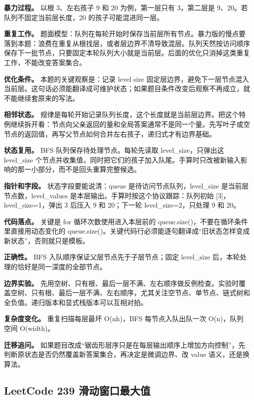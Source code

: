\textbf{暴力过程。} 以根 3、左右孩子 9 和 20 为例，第一层只有 3，第二层是 9、20。若队列不固定当前层长度，20 的孩子可能混进同一层。

\textbf{重复工作。} 题面模型：队列在每轮开始时保存当前层所有节点。暴力版的慢点要落到本题：浪费在重复从根找层，或者层边界不清导致混层。队列天然按访问顺序保存下一批节点，只要固定本轮队列大小就是当前层。后面的优化只消掉这类重复工作，不能改变答案集合。

\textbf{优化条件。} 本题的关键观察是：记录 level size 固定层边界，避免下一层节点混入当前层。这句话必须能翻译成可维护状态；如果题目条件改变后观察不再成立，就不能继续套原来的写法。

\textbf{相邻状态。} 规律是每轮开始记录队列长度，这个长度就是当前层边界。把这个特例继续拆开看：节点向父亲返回的量和全局答案通常不是同一个量。先写叶子或空节点的返回值，再写父节点如何合并左右孩子，递归式才有边界基础。

\textbf{状态复用。} BFS 队列保存待处理节点。每轮先读取 level\_size，只弹出这 level\_size 个节点并收集值，同时把它们的孩子加入队尾。手算时只改被新输入影响的那一小部分，而不是回头重算完整候选。

\textbf{指针和字段。} 状态字段要能说清：queue 是待访问节点队列，level\_size 是当前层节点数，level\_values 是本层输出。手算时按这个协议跟踪：队列初始 [3]，level\_size=1，弹出 3 后压入 9 和 20；下一轮 level\_size=2，只处理 9 和 20。

\textbf{代码落点。} 关键是 for 循环次数使用进入本层前的 queue.size()，不要在循环条件里直接用动态变化的 queue.size()。关键代码行必须能逐句翻译成“旧状态怎样变成新状态”，否则就只是模板。

\textbf{正确性。} BFS 入队顺序保证父层节点先于子层节点；固定 level\_size 后，本轮处理的恰好是同一深度的全部节点。

\textbf{边界实验。} 先用空树、只有根、最后一层不满、左右顺序做反例检查。实验时覆盖空树、只有根、最后一层不满、左右顺序，尤其关注空节点、单节点、链式树和全负值。递归版本和显式栈版本可以互相对拍。

\textbf{复杂度变化。} 重复扫描每层最坏 O(nh)，BFS 每节点入队出队一次 O(n)，队列空间 O(width)。

\textbf{迁移追问。} 如果题目改成“锯齿形层序只是在每层输出顺序上增加方向控制”，先判断原状态是否仍然覆盖新答案集合，再决定是微调边界、改 value 语义，还是换算法。

\subsection{LeetCode 239 滑动窗口最大值}

